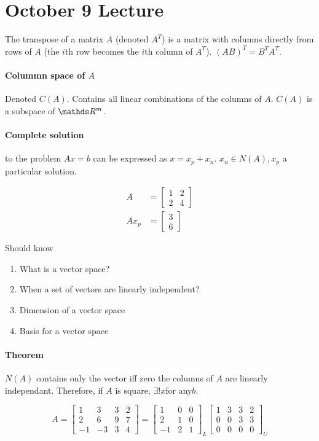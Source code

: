 \section{October 9 Lecture}

The transpose of a matrix $A$ (denoted $A^T$) is a matrix with columns directly from rows of $A$ (the $i$th row becomes the $i$th column of $A^T$). $(AB)^T = B^T A^T$.

\paragraph{Colummn space of $A$} Denoted $C(A)$. Contains all linear combinations of the columns of $A$. $C(A)$ is a subspace of $\bbR^m$.

\paragraph{Complete solution} to the problem $Ax=b$ can be expressed as $x=x_p + x_n$. $x_n \in N(A), x_p$ a particular solution.

\begin{align*}
  A &= \begin{bmatrix}
    1 & 2 \\ 2 & 4
  \end{bmatrix} \\
  A x_p &= \begin{bmatrix}
    3 \\ 6
  \end{bmatrix}
\end{align*}

Should know
\begin{enumerate}
  \item What is a vector space?
  \item When a set of vectors are linearly independent?
  \item Dimension of a vector space
  \item Basis for a vector space
\end{enumerate}

\paragraph{Theorem} $N(A)$ contains only the vector iff zero the columns of $A$ are linearly independant. Therefore, if $A$ is square, $\exists! x $for any$ b$.

\[
  A = \begin{bmatrix}
    1 & 3 & 3 & 2 \\
    2 & 6 & 9 & 7 \\
    -1 & -3 & 3 & 4
  \end{bmatrix} =
  \begin{bmatrix}
    1 & 0 & 0 \\
    2 & 1 & 0 \\
    -1 & 2 & 1 
  \end{bmatrix}_L
  \begin{bmatrix}
    1 & 3 & 3 & 2 \\
    0 & 0 & 3 & 3 \\
    0 & 0 & 0 & 0
  \end{bmatrix}_U
\]

